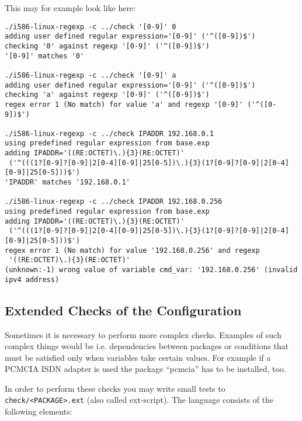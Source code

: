 This may for example look like here:
\begin{example}
\begin{verbatim}
./i586-linux-regexp -c ../check '[0-9]' 0
adding user defined regular expression='[0-9]' ('^([0-9])$')
checking '0' against regexp '[0-9]' ('^([0-9])$')
'[0-9]' matches '0'

./i586-linux-regexp -c ../check '[0-9]' a
adding user defined regular expression='[0-9]' ('^([0-9])$')
checking 'a' against regexp '[0-9]' ('^([0-9])$')
regex error 1 (No match) for value 'a' and regexp '[0-9]' ('^([0-9])$')

./i586-linux-regexp -c ../check IPADDR 192.168.0.1
using predefined regular expression from base.exp
adding IPADDR='((RE:OCTET)\.){3}(RE:OCTET)'
 ('^(((1?[0-9]?[0-9]|2[0-4][0-9]|25[0-5])\.){3}(1?[0-9]?[0-9]|2[0-4][0-9]|25[0-5]))$')
'IPADDR' matches '192.168.0.1'

./i586-linux-regexp -c ../check IPADDR 192.168.0.256
using predefined regular expression from base.exp
adding IPADDR='((RE:OCTET)\.){3}(RE:OCTET)'
 ('^(((1?[0-9]?[0-9]|2[0-4][0-9]|25[0-5])\.){3}(1?[0-9]?[0-9]|2[0-4][0-9]|25[0-5]))$')
regex error 1 (No match) for value '192.168.0.256' and regexp
 '((RE:OCTET)\.){3}(RE:OCTET)'
(unknown:-1) wrong value of variable cmd_var: '192.168.0.256' (invalid ipv4 address)
\end{verbatim}
\end{example}


\subsection{Extended Checks of the Configuration}

    Sometimes it is necessary to perform more complex checks.
    Examples of such complex things would be i.e. dependencies
    between packages or conditions that must be satisfied only
    when variables take certain values. For example if a PCMCIA
    ISDN adapter is used the package ``pcmcia'' has to be installed, too.

    In order to perform these checks you may write small tests to
    \texttt{check/<PACKAGE>.ext} (also called ext-script). The language
    consists of the following elements:

